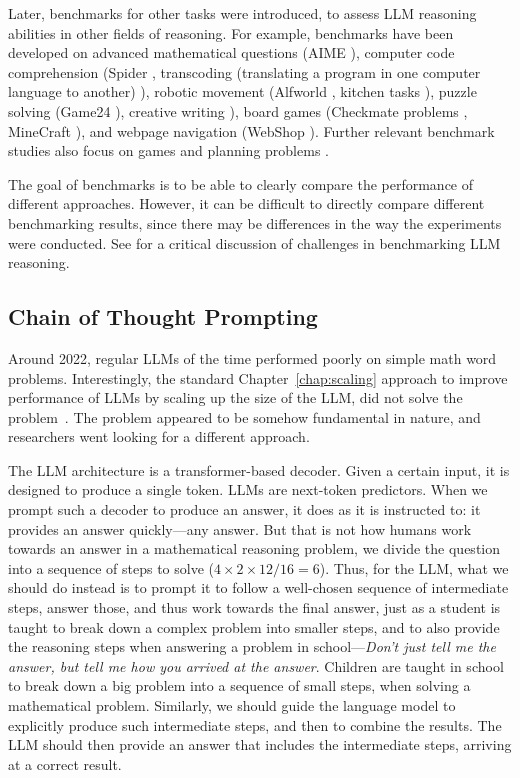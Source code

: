 Later, benchmarks for other tasks were introduced, to assess LLM reasoning abilities 
in other fields of reasoning. For example, benchmarks have been developed on advanced mathematical questions (AIME \citep{codeforcesamerican}),
computer code comprehension (Spider \citep{yu2018spider}, transcoding (translating a program in one computer language to another) \citep{roziere2020unsupervised}), robotic movement (Alfworld \citep{shridhar2020alfworld}, kitchen tasks \citep{ahn2022can}), puzzle solving (Game24 \citep{yao2024tree}), creative writing \citep{yao2024tree}), board games (Checkmate problems \citep{yang2024buffer}, MineCraft \citep{fan2022minedojo}), and webpage navigation (WebShop \citep{yao2022webshop}). 
Further relevant benchmark studies also focus on games and planning problems 
\citep{ruoss2024lmact,paglieri2024balrog,wen2025thinkpatterns}. 

The goal of benchmarks is to be able to clearly compare the performance of different approaches. However,  it can be difficult to directly compare different benchmarking results, since there may be differences in the way the experiments were conducted. See \citet{kamoi2024can,shojaee2025illusion} for  a critical discussion of challenges in benchmarking LLM reasoning. 




\subsection{Chain of Thought Prompting}
Around 2022, regular LLMs of the time performed poorly on simple math word problems. Interestingly, the standard Chapter~\ref{chap:scaling} approach to improve performance of LLMs by scaling up the
size of the LLM, did not solve the problem~\citep{rae2021scaling}. The problem appeared to be somehow fundamental in nature, and researchers went looking for a different approach.
 
The LLM architecture is
a transformer-based decoder. Given a certain input, it is designed to produce a single token. LLMs are next-token predictors. When we
prompt such a decoder to  produce an answer, it does as it is instructed to: it provides an answer quickly---any answer. But that is not how humans work towards an answer in a mathematical reasoning problem, we divide the question into a sequence of steps to solve ($4\times 2\times 12/16=6$). Thus, for the LLM, what we should do instead is to prompt it to follow a well-chosen sequence of intermediate steps, answer those, and thus work towards the final answer, just as a student is taught to break down a complex problem into smaller steps, and to also provide the reasoning steps when answering a problem in school---{\em Don't just tell me the answer, but tell me how you {\em arrived} at the answer}.  Children are taught in school to break down a big problem into  a sequence of small steps, when solving a mathematical problem. Similarly, we
should guide the language model to explicitly produce such intermediate steps, and then to combine the  results.  The LLM should then  provide an answer that includes the intermediate steps, arriving at a correct result.


